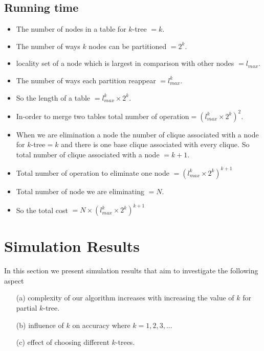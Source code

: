 \documentclass[11pt]{article}
\begin{document}
\subsection{Running time}
\begin{itemize}[noitemsep]
\item The number of nodes in a table for $k$-tree $=k$.
\item The number of ways $k$ nodes can be partitioned $=2^k$.
\item locality set of a node which is largest in comparison with other nodes $=l_{max}$.
\item The number of ways each partition reappear $=l_{max}^k$.
\item So the length of a table $=l_{max}^k \times 2^k$.
\item In-order to merge two tables total number of operation$=(l_{max}^k \times 2^k)^2$.
\item When we are elimination a node the number of clique associated with a node for $k$-tree$=k$ and there is one base clique associated with every clique. So total number of clique associated with a node $=k+1$.
\item Total number of operation to eliminate one node $=(l_{max}^k \times 2^k)^{k+1}$
\item Total number of node we are eliminating $=N$.
\item So the total cost $=N \times( l_{max}^k \times 2^k)^{k+1}$
\
\end{itemize}

\section{Simulation Results}
In this section we present simulation results that aim to investigate the following aspect 
\begin{itemize}
\item[(a)] complexity of our algorithm increases with increasing the value of $k$ for partial $k$-tree.
\item[(b)] influence of $k$ on accuracy where $k=1,2,3,..$.
\item[(c)] effect of choosing different $k$-trees.
\end{itemize}
 
\end{document}
